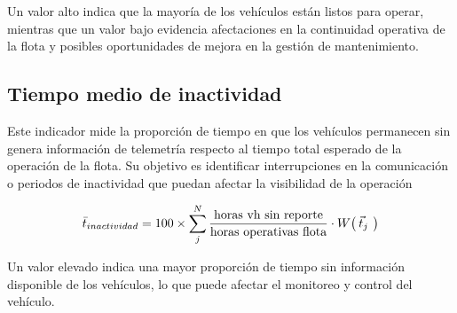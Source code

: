 Un valor alto indica que la mayoría de los vehículos están listos para operar, mientras que un valor bajo evidencia afectaciones en la continuidad operativa de la flota y posibles oportunidades de mejora en la gestión de mantenimiento.


\subsection{Tiempo medio de inactividad}

Este indicador mide la proporción de tiempo en que los vehículos permanecen sin genera información de telemetría respecto al tiempo total esperado de la operación de la flota. Su objetivo es identificar interrupciones en la comunicación o periodos de inactividad que puedan afectar la visibilidad de la operación 

\begin{equation*}
    \bar{t}_{inactividad} = 100 \times \sum_j^N \frac{\text{horas vh sin reporte}}{\text{horas operativas flota}} \cdot W\big( \hspace{0.07cm} \smash{\vec{t}_j}\,\vphantom{t} \hspace{0.07cm} \big)
\end{equation*}

Un valor elevado indica una mayor proporción de tiempo sin información disponible de los vehículos, lo que puede afectar el monitoreo y control del vehículo.

